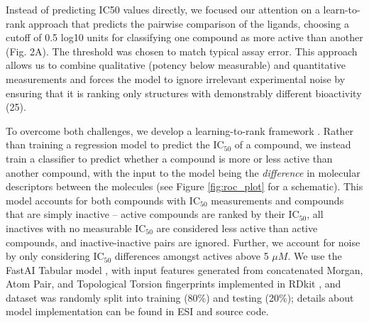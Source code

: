 Instead of predicting IC50 values directly, we focused our attention on a learn-to-rank approach that predicts the pairwise comparison of the ligands, choosing a cutoff of 0.5 log10 units for classifying one compound as more active than another (Fig. 2A). The threshold was chosen to match typical assay error. This approach allows us to combine qualitative (potency below measurable) and quantitative measurements and forces the model to ignore irrelevant experimental noise by ensuring that it is ranking only structures with demonstrably different bioactivity (25).

To overcome both challenges, we develop a learning-to-rank framework \cite{duffy2010molecular,agarwal2010ranking}. Rather than training a regression model to predict the $\mathrm{IC}_{50}$ of a compound, we instead train a classifier to predict whether a compound is more or less active than another compound, with the input to the model being the \emph{difference} in molecular descriptors between the molecules (see Figure \ref{fig:roc_plot} for a schematic). This model accounts for both compounds with $\mathrm{IC}_{50}$ measurements and compounds that are simply inactive -- active compounds are ranked by their $\mathrm{IC}_{50}$, all inactives with no measurable $\mathrm{IC}_{50}$ are considered less active than active compounds, and inactive-inactive pairs are ignored. Further, we account for noise by only considering $\mathrm{IC}_{50}$ differences amongst actives above 5 $\mu M$. We use the FastAI Tabular model \cite{howard2018fastai}, with input features generated from concatenated Morgan, Atom Pair, and Topological Torsion fingerprints implemented in RDkit \cite{rdkit}, and dataset was randomly split into training (80\%) and testing (20\%); details about model implementation can be found in ESI and source code.



